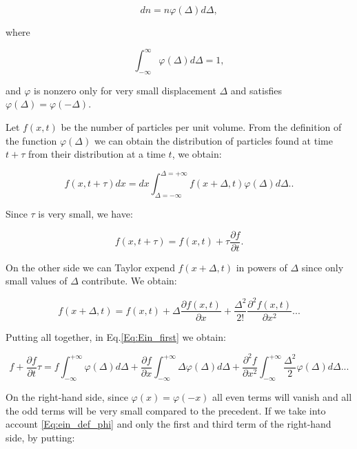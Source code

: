 \begin{equation}
	dn = n\varphi(\Delta)d\Delta,
\end{equation}

where

\begin{equation}
	\int_{-\infty} ^{\infty} \varphi (\Delta)d \Delta = 1,
	\label{Eq:ein_def_phi}
\end{equation}

and $\varphi$ is nonzero only for very small displacement $\Delta$ and satisfies $\varphi (\Delta) = \varphi (-\Delta)$.

Let $f(x,t)$ be the number of particles per unit volume. From the definition of the function $\varphi(\Delta)$ we can obtain the distribution of particles found at time $ t + \tau$ from their distribution at a time $t$, we obtain:

\begin{equation}
	f(x, t+\tau)dx = dx\int_{\Delta = -\infty} ^{\Delta = +\infty} f(x+\Delta, t) \varphi (\Delta) d\Delta.
	\label{Eq:Ein_first}.
\end{equation}

Since $\tau$ is very small, we have:

\begin{equation}
	f(x, t+\tau) = f(x,t) + \tau \frac{\partial f}{\partial t}.
\end{equation}

On the other side we can Taylor expend $f(x+\Delta, t)$ in powers of $\Delta$ since only small values of $\Delta$ contribute. We obtain:

\begin{equation}
	f(x + \Delta, t) = f(x,t) + \Delta \frac{\partial f(x,t)}{\partial x} + \frac{\Delta ^2}{2!} \frac{\partial ^2 f(x,t)}{\partial x^2}...
\end{equation}

Putting all together, in Eq.\ref{Eq:Ein_first} we obtain:

\begin{equation}
	f + \frac{\partial f}{\partial t} \tau = f \int_{-\infty}^{+\infty} \varphi(\Delta)d \Delta + \frac{\partial f}{\partial x} \int_{-\infty}^{+\infty} \Delta \varphi (\Delta)d \Delta + \frac{\partial ^2 f}{\partial x^2} \int_{-\infty}^{+\infty} \frac{\Delta ^2}{2} \varphi(\Delta)d\Delta ...
	\label{Eq:ein_expended}
\end{equation}

On the right-hand side, since $\varphi(x) = \varphi(-x)$ all even terms will vanish and all the odd terms will be very small compared to the precedent. If we take into account \ref{Eq:ein_def_phi} and only the first and third term of the right-hand side, by putting:



